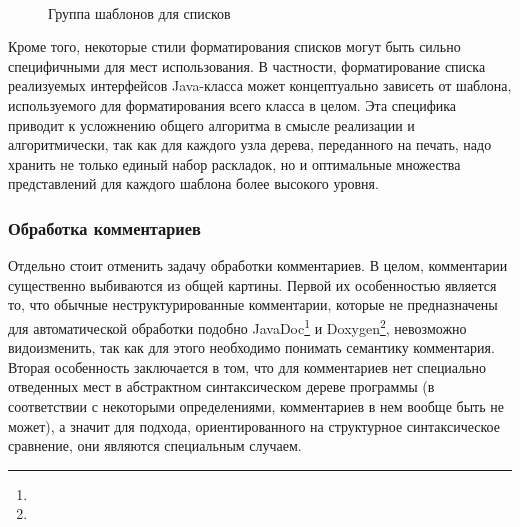 \begin{figure}[h!]
  \centering
  ~
  \caption{Группа шаблонов для списков}
  \label{fig:tmpltGroup}
\end{figure}

Кроме того, некоторые стили
форматирования списков могут быть сильно специфичными для мест использования.
В частности, форматирование списка реализуемых интерфейсов Java-класса может
концептуально зависеть от шаблона, используемого для форматирования всего класса
в целом. Эта специфика приводит к усложнению общего алгоритма в смысле реализации
и алгоритмически, так как для каждого узла дерева, переданного на печать,
надо хранить не только единый набор раскладок, но и оптимальные
множества представлений для каждого шаблона более высокого уровня.




\newpage
\subsubsection{Обработка комментариев}

Отдельно стоит отменить задачу обработки комментариев. В целом, комментарии
существенно выбиваются из общей картины. Первой их особенностью является то,
что обычные неструктурированные комментарии, которые не
предназначены для автоматической обработки подобно
JavaDoc\footnote{}
и Doxygen\footnote{},
невозможно видоизменить, так как для этого необходимо понимать семантику
комментария. Вторая особенность заключается в том, что для комментариев нет
специально отведенных мест в абстрактном синтаксическом дереве программы
(в соответствии с некоторыми определениями, комментариев в нем вообще быть не может),
а значит для подхода, ориентированного на структурное синтаксическое сравнение, они
являются специальным случаем.

